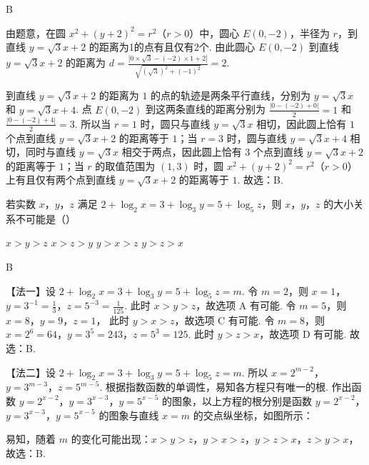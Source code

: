 \begin{answer}
B
\end{answer}

\begin{solution}
由题意，在圆 \(x^2 + (y+2)^2 = r^2\)（\(r>0\)）中，圆心 \(E(0,-2)\)，半径为 \(r\)，到直线 \(y = \sqrt{3}x + 2\) 的距离为1的点有且仅有2个.
由此圆心 \(E(0,-2)\) 到直线 \(y = \sqrt{3}x + 2\) 的距离为 \(d=\frac{\left|0 \times \sqrt{3}-(-2) \times 1+2\right|}{\sqrt{(\sqrt{3})^2+(-1)^2}}=2\).


到直线 \(y=\sqrt{3}x+2\) 的距离为 \(1\) 的点的轨迹是两条平行直线，分别为 \(y=\sqrt{3}x\) 和 \(y=\sqrt{3}x+4\). 点 \(E(0,-2)\) 到这两条直线的距离分别为 \(\frac{|0-(-2)+0|}{2}=1\) 和 \(\frac{|0-(-2)+4|}{2}=3\). 所以当 \(r=1\) 时，圆只与直线 \(y=\sqrt{3}x\) 相切，因此圆上恰有 \(1\) 个点到直线 \(y = \sqrt{3}x + 2\) 的距离等于 \(1\)；当 \(r=3\) 时，圆与直线 \(y=\sqrt{3}x+4\) 相切，同时与直线 \(y=\sqrt{3}x\) 相交于两点，因此圆上恰有 \(3\) 个点到直线 \(y = \sqrt{3}x + 2\) 的距离等于 \(1\)；当 \(r\) 的取值范围为 \((1,3)\) 时，圆 \(x^2 + (y+2)^2 = r^2\)（\(r>0\)）上有且仅有两个点到直线 \(y = \sqrt{3}x + 2\) 的距离等于 \(1\). 故选：B.
\end{solution}

\begin{problem}
若实数 \(x\)，\(y\)，\(z\) 满足 \(2 + \log_2 x = 3 + \log_3 y = 5 + \log_5 z\)，则 \(x\)，\(y\)，\(z\) 的大小关系不可能是（\quad）

\choices
    {\(x > y > z\)}
    {\(x > z > y\)}
    {\(y > x > z\)}
    {\(y > z > x\)}
\end{problem}

\begin{answer}
B
\end{answer}

\begin{solution}
【法一】设 \(2 + \log_2 x = 3 + \log_3 y = 5 + \log_5 z = m\). 令 \(m = 2\)，则
\(x = 1\)，\(y = 3^{-1} = \frac{1}{3}\)，\(z = 5^{-3} = \frac{1}{125}\).
此时 \(x > y > z\)，故选项 A 有可能. 令 \(m = 5\)，则
\(x = 8\)，\(y = 9\)，\(z = 1\)，
此时 \(y > x > z\)，故选项 C 有可能. 令 \(m = 8\)，则
\(x = 2^6 = 64\)，\(y = 3^5 = 243\)，\(z = 5^3 = 125\).
此时 \(y > z > x\)，故选项 D 有可能. 故选：B.

【法二】设 \(2 + \log_2 x = 3 + \log_3 y = 5 + \log_5 z = m\). 所以 \(x = 2^{m-2}\)，\(y = 3^{m-3}\)，\(z = 5^{m-5}\).
根据指数函数的单调性，易知各方程只有唯一的根. 作出函数 \(y = 2^{x-2}\)，\(y = 3^{x-3}\)，\(y = 5^{x-5}\) 的图象，以上方程的根分别是函数 \(y = 2^{x-2}\)，\(y = 3^{x-3}\)，\(y = 5^{x-5}\) 的图象与直线 \(x = m\) 的交点纵坐标，如图所示：


易知，随着 \(m\) 的变化可能出现：\(x > y > z\)，\(y > x > z\)，\(y > z > x\)，\(z > y > x\)，故选：B.
\end{solution}

